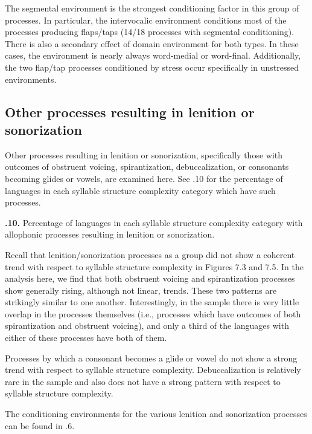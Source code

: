   The segmental environment is the strongest conditioning factor in this group of processes. In particular, the intervocalic environment conditions most of the processes producing flaps/taps (14/18 processes with segmental conditioning). There is also a secondary effect of domain environment for both types. In these cases, the environment is nearly always word-medial or word-final. Additionally, the two flap/tap processes conditioned by stress occur specifically in unstressed environments.

\subsection{Other processes resulting in lenition or sonorization}\label{sec:7.3.6}

  Other processes resulting in lenition or sonorization, specifically those with outcomes of obstruent voicing, spirantization, debuccalization, or consonants becoming glides or vowels, are examined here. See .10 for the percentage of languages in each syllable structure complexity category which have such processes.

\textbf{.10.} Percentage of languages in each syllable structure complexity category with allophonic processes resulting in lenition or sonorization.

  Recall that lenition/sonorization processes as a group did not show a coherent trend with respect to syllable structure complexity in Figures 7.3 and 7.5. In the analysis here, we find that both obstruent voicing and spirantization processes show generally rising, although not linear, trends. These two patterns are strikingly similar to one another. Interestingly, in the sample there is very little overlap in the processes themselves (i.e., processes which have outcomes of both spirantization and obstruent voicing), and only a third of the languages with either of these processes have both of them.

  Processes by which a consonant becomes a glide or vowel do not show a strong trend with respect to syllable structure complexity. Debuccalization is relatively rare in the sample and also does not have a strong pattern with respect to syllable structure complexity.

  The conditioning environments for the various lenition and sonorization processes can be found in .6.

